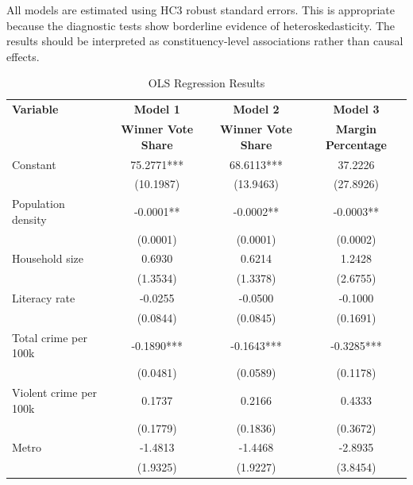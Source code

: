 \documentclass[12pt,a4paper]{article}
\begin{document}
All models are estimated using HC3 robust standard errors. This is appropriate because the diagnostic tests show borderline evidence of heteroskedasticity. The results should be interpreted as constituency-level associations rather than causal effects.

\begin{table}[H]
\centering
\caption{OLS Regression Results}
\label{tab:ols_results}
\footnotesize
\renewcommand{\arraystretch}{1.15}
\begin{tabular}{lccc}
\toprule
\textbf{Variable} & \textbf{Model 1} & \textbf{Model 2} & \textbf{Model 3} \\
 & \textbf{Winner Vote Share} & \textbf{Winner Vote Share} & \textbf{Margin Percentage} \\
\midrule

Constant 
& 75.2771*** 
& 68.6113*** 
& 37.2226 \\

& (10.1987) 
& (13.9463) 
& (27.8926) \\

Population density 
& -0.0001** 
& -0.0002** 
& -0.0003** \\

& (0.0001) 
& (0.0001) 
& (0.0002) \\

Household size 
& 0.6930 
& 0.6214 
& 1.2428 \\

& (1.3534) 
& (1.3378) 
& (2.6755) \\

Literacy rate 
& -0.0255 
& -0.0500 
& -0.1000 \\

& (0.0844) 
& (0.0845) 
& (0.1691) \\

Total crime per 100k 
& -0.1890*** 
& -0.1643*** 
& -0.3285*** \\

& (0.0481) 
& (0.0589) 
& (0.1178) \\

Violent crime per 100k 
& 0.1737 
& 0.2166 
& 0.4333 \\

& (0.1779) 
& (0.1836) 
& (0.3672) \\

Metro 
& -1.4813 
& -1.4468 
& -2.8935 \\

& (1.9325) 
& (1.9227) 
& (3.8454) \\


\end{tabular}
\end{table}
\end{document}
